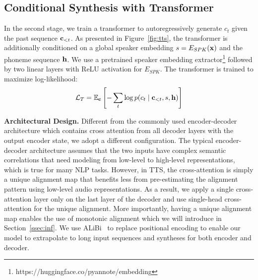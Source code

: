 \documentclass[letterpaper]{article}
\begin{document}


\subsection{Conditional Synthesis with Transformer}
In the second stage, we train a transformer to autoregressively generate $c_t$ given the past sequence $\vb{c}_{<t}$.
As presented in Figure~\ref{fig:tts}, the transformer is additionally conditioned on a global speaker embedding $s = E_{SPK}(\vb{x})$ and the phoneme sequence $\vb{h}$.
We use a pretrained speaker embedding extractor\footnote{https://huggingface.co/pyannote/embedding} followed by two linear layers with ReLU activation for $E_{SPK}$.
The transformer is trained to maximize log-likelihood:
\begin{gather}
    \mathcal{L}_T = \mathbb{E}_{\vb{c}}\left[-\sum_{t}\log{p(c_{t}\mid \vb{c}_{<t}, s, \vb{h})}\right]
\end{gather}

\textbf{Architectural Design.}
Different from the commonly used encoder-decoder architecture which contains cross attention from all decoder layers with the output encoder state, we adopt a different configuration.
The typical encoder-decoder architecture assumes that the two inputs have complex semantic correlations that need modeling from low-level to high-level representations, which is true for many NLP tasks.
However, in TTS, the cross-attention is simply a unique alignment map that benefits less from pre-estimating the alignment pattern using low-level audio representations.
As a result, we apply a single cross-attention layer only on the last layer of the decoder and use single-head cross-attention for the unique alignment.
More importantly, having a unique alignment map enables the use of monotonic alignment which we will introduce in Section~\ref{ssec:inf}.
We use ALiBi~\cite{alibi} to replace positional encoding to enable our model to extrapolate to long input sequences and syntheses for both encoder and decoder.
\end{document}

